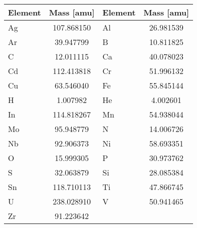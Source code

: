   \begin{longtable}{l c l c}
    \toprule
    Element & Mass [amu] & Element & Mass [amu] \\
    \midrule
    \midrule
Ag & 107.868150 & Al & 26.981539 \\
Ar & 39.947799 & B & 10.811825 \\
C & 12.011115 & Ca & 40.078023 \\
Cd & 112.413818 & Cr & 51.996132 \\
Cu & 63.546040 & Fe & 55.845144 \\
H & 1.007982 & He & 4.002601 \\
In & 114.818267 & Mn & 54.938044 \\
Mo & 95.948779 & N & 14.006726 \\
Nb & 92.906373 & Ni & 58.693351 \\
O & 15.999305 & P & 30.973762 \\
S & 32.063879 & Si & 28.085384 \\
Sn & 118.710113 & Ti & 47.866745 \\
U & 238.028910 & V & 50.941465 \\
Zr & 91.223642 & & \\

    \bottomrule
  \end{longtable}